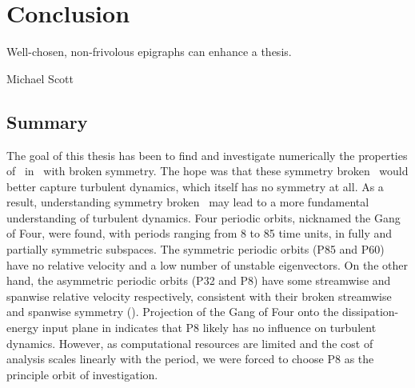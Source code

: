 \chapter*{Conclusion}
	\setcounter{chapter}{5}
	\setcounter{section}{0}
	\epigraph{
	Well-chosen, non-frivolous epigraphs can enhance a thesis.
	}{Michael Scott} 

\section{Summary}

The goal of this thesis has been to find and investigate numerically the properties of \ecs\ in \pCf\ with broken symmetry. The hope was that these symmetry broken \ecs\ would better capture turbulent dynamics, which itself has no symmetry at all. As a result, understanding symmetry broken \ecs\ may lead to a more fundamental understanding of turbulent dynamics. Four periodic orbits, nicknamed the Gang of Four, were found, with periods ranging from 8 to 85 time units, in fully and partially symmetric subspaces. The symmetric periodic orbits (P85 and P60) have no relative velocity and a low number of unstable eigenvectors. On the other hand, the asymmetric periodic orbits (P32 and P8) have some streamwise and spanwise relative velocity respectively, consistent with their broken streamwise and spanwise symmetry ().  Projection of the Gang of Four onto the dissipation-energy input plane in  indicates that P8 likely has no influence on turbulent dynamics. However, as computational resources are limited and the cost of analysis scales linearly with the period, we were forced to choose P8 as the principle orbit of investigation. \\ 

